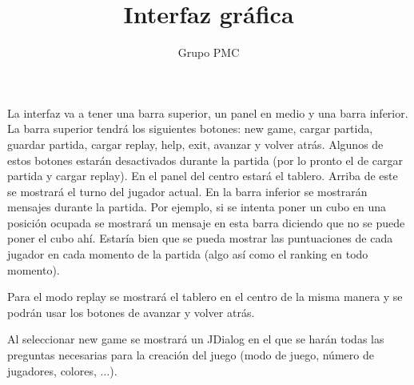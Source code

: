 \documentclass[14pt]{extreport}
\author{Grupo PMC}
\begin{document}
\title{Interfaz gráfica}
\maketitle

La interfaz va a tener una barra superior, un panel en medio y una barra inferior.
La barra superior tendrá los siguientes botones: new game, cargar partida, guardar partida, cargar replay, help, exit, avanzar y volver atrás. Algunos de estos botones estarán desactivados durante la partida (por lo pronto el de cargar partida y cargar replay).
En el panel del centro estará el tablero. Arriba de este se mostrará el turno del jugador actual.
En la barra inferior se mostrarán mensajes durante la partida. Por ejemplo, si se intenta poner un cubo en una posición ocupada se mostrará un mensaje en esta barra diciendo que no se puede poner el cubo ahí.
Estaría bien que se pueda mostrar las puntuaciones de cada jugador en cada momento de la partida (algo así como el ranking en todo momento).

Para el modo replay se mostrará el tablero en el centro de la misma manera y se podrán usar los botones de avanzar y volver atrás.

Al seleccionar new game se mostrará un JDialog en el que se harán todas las preguntas necesarias para la creación del juego (modo de juego, número de jugadores, colores, ...).
\end{document}
